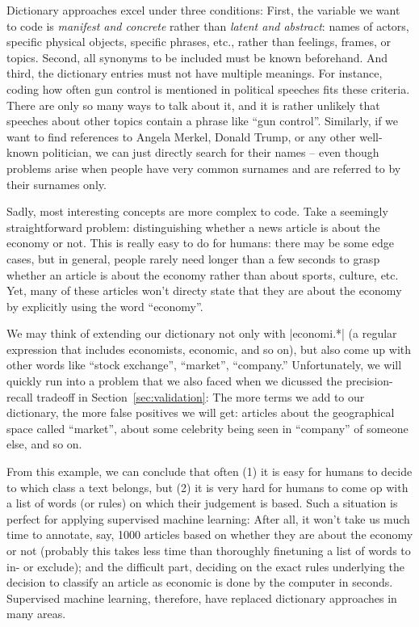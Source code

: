 Dictionary approaches excel under three conditions: First, the
variable we want to code is \emph{manifest and concrete} rather than
\emph{latent and abstract}: names of actors, specific physical
objects, specific phrases, etc., rather than feelings, frames, or
topics. Second, all synonyms to be included must be known
beforehand. And third, the dictionary entries must not have multiple
meanings.
For instance, coding how often gun control is mentioned in political
speeches fits these criteria. There are only so many ways to talk
about it, and it is rather unlikely that speeches about other topics
contain a phrase like ``gun control''. Similarly, if we want to find
references to Angela Merkel, Donald Trump, or any other well-known
politician, we can just directly search for their names -- even though
problems arise when people have very common surnames and are referred
to by their surnames only.

Sadly, most interesting concepts are more complex to code. Take a
seemingly straightforward problem: distinguishing whether a news
article is about the economy or not. This is really easy to do for
humans: there may be some edge cases, but in general, people rarely
need longer than a few seconds to grasp whether an article is about the
economy rather than about sports, culture, etc. Yet, many of these
articles won't directy state that they are about the economy by
explicitly using the word ``economy''.

We may think of extending our dictionary not only with |economi.*| (a
regular expression that includes economists, economic, and so on), but
also come up with other words like ``stock exchange'', ``market'',
``company.'' Unfortunately, we will quickly run into a problem that we also
faced when we dicussed the precision-recall tradeoff in
Section~\ref{sec:validation}: The more terms we add to our
dictionary, the more false positives we will get: articles about
the geographical space called ``market'', about some celebrity being seen
in ``company'' of someone else, and so on.

From this example, we can conclude that often (1) it is easy for
humans to decide to which class a text belongs, but (2) it is very
hard for humans to come op with a list of words (or rules) on which
their judgement is based.  Such a situation is perfect for applying
supervised machine learning: After all, it won't take us much time to
annotate, say, 1000 articles based on whether they are about the
economy or not (probably this takes less time than thoroughly
finetuning a list of words to in- or exclude); and the difficult part,
deciding on the exact rules underlying the decision to classify an
article as economic is done by the computer in seconds. Supervised
machine learning, therefore, have replaced dictionary approaches in
many areas.


